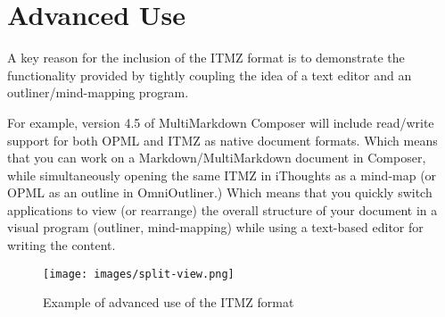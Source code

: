\section{Advanced Use}
\label{advanceduse}

A key reason for the inclusion of the ITMZ format is to demonstrate the functionality provided by tightly coupling the idea of a text editor and an outliner\slash{}mind-mapping program.

For example, version 4.5 of MultiMarkdown Composer will include read\slash{}write support for both OPML and ITMZ as native document formats. Which means that you can work on a Markdown\slash{}MultiMarkdown document in Composer, while simultaneously opening the same ITMZ in iThoughts as a mind-map (or OPML as an outline in OmniOutliner.) Which means that you quickly switch applications to view (or rearrange) the overall structure of your document in a visual program (outliner, mind-mapping) while using a text-based editor for writing the content.

\begin{figure}[htbp]
\centering
\texttt{[image: images/split-view.png]}
\caption{Example of advanced use of the ITMZ format}
\end{figure}



